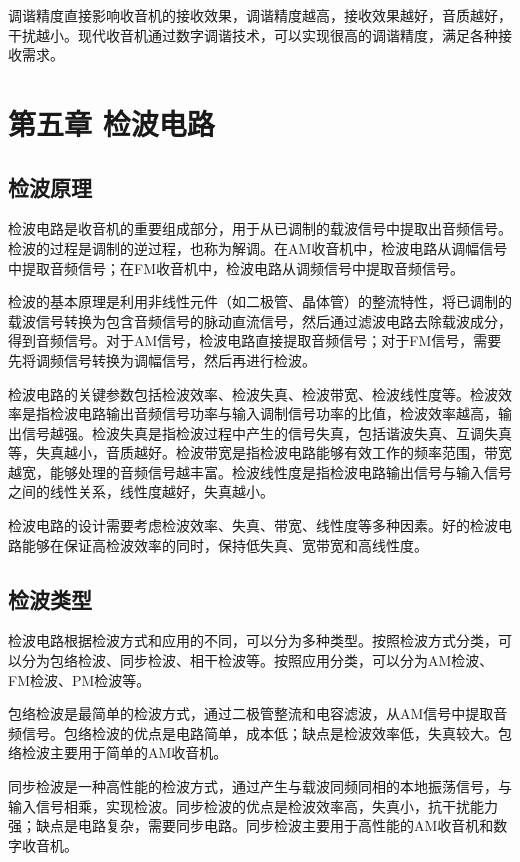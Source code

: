 \documentclass[12pt,UTF8]{ctexbook}
\begin{document}
调谐精度直接影响收音机的接收效果，调谐精度越高，接收效果越好，音质越好，干扰越小。现代收音机通过数字调谐技术，可以实现很高的调谐精度，满足各种接收需求。

\chapter{第五章 检波电路}

\section{检波原理}

检波电路是收音机的重要组成部分，用于从已调制的载波信号中提取出音频信号。检波的过程是调制的逆过程，也称为解调。在AM收音机中，检波电路从调幅信号中提取音频信号；在FM收音机中，检波电路从调频信号中提取音频信号。

检波的基本原理是利用非线性元件（如二极管、晶体管）的整流特性，将已调制的载波信号转换为包含音频信号的脉动直流信号，然后通过滤波电路去除载波成分，得到音频信号。对于AM信号，检波电路直接提取音频信号；对于FM信号，需要先将调频信号转换为调幅信号，然后再进行检波。

检波电路的关键参数包括检波效率、检波失真、检波带宽、检波线性度等。检波效率是指检波电路输出音频信号功率与输入调制信号功率的比值，检波效率越高，输出信号越强。检波失真是指检波过程中产生的信号失真，包括谐波失真、互调失真等，失真越小，音质越好。检波带宽是指检波电路能够有效工作的频率范围，带宽越宽，能够处理的音频信号越丰富。检波线性度是指检波电路输出信号与输入信号之间的线性关系，线性度越好，失真越小。

检波电路的设计需要考虑检波效率、失真、带宽、线性度等多种因素。好的检波电路能够在保证高检波效率的同时，保持低失真、宽带宽和高线性度。

\section{检波类型}

检波电路根据检波方式和应用的不同，可以分为多种类型。按照检波方式分类，可以分为包络检波、同步检波、相干检波等。按照应用分类，可以分为AM检波、FM检波、PM检波等。

包络检波是最简单的检波方式，通过二极管整流和电容滤波，从AM信号中提取音频信号。包络检波的优点是电路简单，成本低；缺点是检波效率低，失真较大。包络检波主要用于简单的AM收音机。

同步检波是一种高性能的检波方式，通过产生与载波同频同相的本地振荡信号，与输入信号相乘，实现检波。同步检波的优点是检波效率高，失真小，抗干扰能力强；缺点是电路复杂，需要同步电路。同步检波主要用于高性能的AM收音机和数字收音机。
\end{document}
